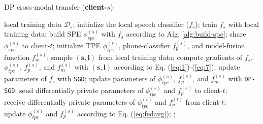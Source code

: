 \documentclass[11pt]{article}
\begin{document}
\begin{algorithm}[!htp]
\caption{DP cross-modal transfer (\textbf{client-$s$})} 
\label{alg:s-side} 
\small
\begin{algorithmic}[1]
    \REQUIRE local training data $\mathcal{D}_s$;
    \STATE initialize the local speech classifier (${f}_{s}$);
    \STATE train ${f}_{s}$ with local training data;
    \STATE  build SPE ${\phi}_{spe}^{(s)}$ with ${f}_{s}$ according to Alg. \ref{alg:build-spe};
    \STATE  share ${\phi}_{spe}^{(s)}$ to client-$t$;
    \STATE initialize TPE ${\phi}_{tpe}^{(s)}$, phone-classifier ${f}_{p}^{(s)}$, and model-fusion function ${f}_m^{(s)}$;
            \STATE sample $(\mathbf{s}, \mathbf{l})$ from local training data;
            \STATE compute gradients of ${f}_{s}$, ${\phi}_{tpe}^{(s)}$, ${f}_{p}^{(s)}$, and ${f}_m^{(s)}$ with $(\mathbf{s}, \mathbf{l})$ according to Eq. (\ref{eq:1})-(\ref{eq:7});
            \STATE update parameters of ${f}_{s}$ with \texttt{SGD};
            \STATE update parameters of ${\phi}_{tpe}^{(s)}$, ${f}_{p}^{(s)}$, and ${f}_m^{(s)}$ with \texttt{DP-SGD};
        \ENDFOR
        \STATE send differentially private parameters of ${\phi}_{tpe}^{(s)}$ and ${f}_{p}^{(s)}$ to client-$t$; \\
        \STATE receive differentially private parameters of ${\phi}_{tpe}^{(t)}$ and ${f}_{p}^{(t)}$ from client-$t$; \\
        \STATE update ${\phi}_{tpe}^{(s)}$ and ${f}_{p}^{(s)}$ according to Eq. (\ref{eq:fedavg});
    \ENDWHILE
    ;
\end{algorithmic}
\end{algorithm} %
\end{document}
